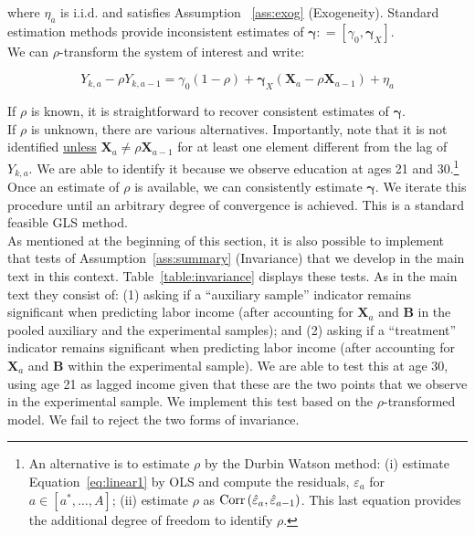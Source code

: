 \noindent where $\eta_{a}$ is i.i.d. and satisfies Assumption ~\ref{ass:exog} (Exogeneity). Standard estimation methods provide inconsistent estimates of $\bm{\gamma} : = [\gamma_{0}, \bm{\gamma}_{X}]$.\\

\noindent We can $\rho$-transform the system of interest and write: 


\begin{equation}
Y_{k,a} - \rho Y_{k,a-1} = \gamma_{0} \left( 1 - \rho \right) + \bm{\gamma}_{X} \left( \bm{X}_{a} - \rho \bm{X}_{a-1} \right) + \eta_{a}
\end{equation}

\noindent If $\rho$ is known, it is straightforward to recover consistent estimates of $\bm{\gamma}$.\\

\noindent If $\rho$ is unknown, there are various alternatives. Importantly, note that it is not identified \underline{unless} $\bm{X}_{a} \neq \rho \bm{X}_{a-1}$ for at least one element different from the lag of $Y_{k,a} $. We are able to identify it because we observe education at ages 21 and 30.\footnote{An alternative is to estimate $\rho$ by the Durbin Watson method: (i) estimate Equation~\eqref{eq:linear1} by OLS and compute the residuals, $\varepsilon_{a}$ for $a \in [a^*, \ldots, A]$; (ii) estimate $\rho$ as  $\operatorname{Corr} \left( \hat{\varepsilon}_{a}, \hat{\varepsilon}_{a-1} \right)$. This last equation provides the additional degree of freedom to identify $\rho$.}\\ 

\noindent Once an estimate of $\rho$ is available, we can consistently estimate $\bm{\gamma}$. We iterate this procedure until an arbitrary degree of convergence is achieved. This is a standard feasible GLS method.\\ 

\noindent As mentioned at the beginning of this section, it is also possible to implement that tests of Assumption~\ref{ass:summary} (Invariance)  that we develop in the main text in this context. Table~\ref{table:invariance} displays these tests. As in the main text they consist of: (1) asking if a ``auxiliary sample'' indicator remains significant when predicting labor income (after accounting for $\bm{X}_{a}$ and $\bm{B}$ in the pooled auxiliary and the experimental samples); and (2) asking if a ``treatment'' indicator remains significant when predicting labor income (after accounting for $\bm{X}_{a}$ and $\bm{B}$ within the experimental sample). We are able to test this at age 30, using age 21 as lagged income given that these are the two points that we observe in the experimental sample. We implement this test based on the $\rho$-transformed model. We fail to reject the two forms of invariance.\\

